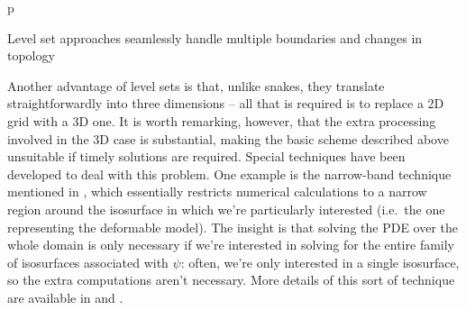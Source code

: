 \begin{stusubfig}{p}
	\\ \vspace{4mm}%
\caption{Level set approaches seamlessly handle multiple boundaries and changes in topology}
\label{fig:background-segmentation-levelsets-topologychanges}
\end{stusubfig}

Another advantage of level sets is that, unlike snakes, they translate straightforwardly into three dimensions -- all that is required is to replace a 2D grid with a 3D one. It is worth remarking, however, that the extra processing involved in the 3D case is substantial, making the basic scheme described above unsuitable if timely solutions are required. Special techniques have been developed to deal with this problem. One example is the narrow-band technique mentioned in \cite{malladi95}, which essentially restricts numerical calculations to a narrow region around the isosurface in which we're particularly interested (i.e.~the one representing the deformable model). The insight is that solving the PDE over the whole domain is only necessary if we're interested in solving for the entire family of isosurfaces associated with $\psi$: often, we're only interested in a single isosurface, so the extra computations aren't necessary. More details of this sort of technique are available in \cite{malladi95} and \cite{itk}.

